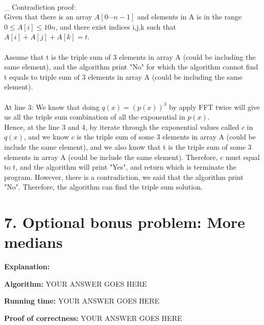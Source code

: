 \documentclass[11pt]{article}
\begin{document}
\\
\_ Contradiction proof:\\
Given that there is an array $A[0 \cdots n-1]$ and elements in A is in the range $0 \leqslant A[i] \leqslant 10n$, and there exist indices i,j,k such that $A[i] +A[j] + A[k] = t$.\\
\\
Assume that t is the triple sum of 3 elements in array A (could be including the same element), and the algorithm print "No" for which the algorithm cannot find t equals to triple sum of 3 elements in array A (could be including the same element).\\
\\
At line 3: We know that doing $q(x) = (p(x))^3$ by apply FFT twice will give us all the triple sum combination of all the exponential in $p(x)$.\\
Hence, at the line 3 and 4, by iterate through the exponential values called $c$ in $q(x)$, and we know $c$ is the triple sum of some 3 elements in array A (could be include the same element), and we also know that t is the triple sum of some 3 elements in array A (could be include the same element). Therefore, $c$ must equal to $t$, and the algorithm will print "Yes", and return which is terminate the program. However, there is a contradiction, we said that the algorithm print "No". Therefore, the algorithm can find the triple sum solution.\\

\newpage
\section*{7. Optional bonus problem: More medians}
\noindent
\textbf{Explanation:}


\noindent
\textbf{Algorithm:}
YOUR ANSWER GOES HERE

\noindent
\textbf{Running time:}
YOUR ANSWER GOES HERE

\noindent
\textbf{Proof of correctness:}
YOUR ANSWER GOES HERE
\end{document}
